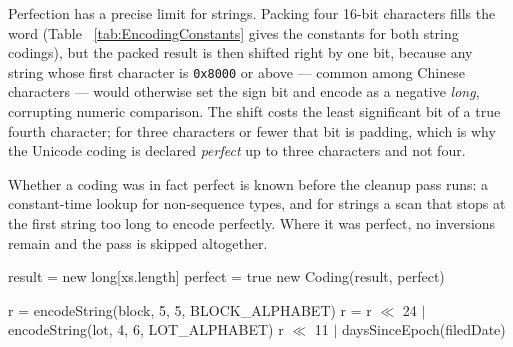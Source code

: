 \documentclass[twoside,leqno,twocolumn]{article}
\begin{document}
Perfection has a precise limit for strings.
Packing four 16-bit characters fills the word (Table ~\ref{tab:EncodingConstants} gives the constants for
both string codings), but the packed result is then shifted right by one bit, because any string whose
first character is \texttt{0x8000} or above --- common among Chinese characters --- would otherwise set the
sign bit and encode as a negative \textit{long}, corrupting numeric comparison.
The shift costs the least significant bit of a true fourth character; for three characters or fewer that
bit is padding, which is why the Unicode coding is declared \textit{perfect} up to three characters and
not four.

Whether a coding was in fact perfect is known before the cleanup pass runs: a constant-time lookup for
non-sequence types, and for strings a scan that stops at the first string too long to encode perfectly.
Where it was perfect, no inversions remain and the pass is skipped altogether.


\begin{algorithm2e}
 result = new long[xs.length]\;
 perfect = true\;
 \Return new Coding(result, perfect)\;
 \caption{huskyEncode. Perfection depends on the data, not only on the coder, so it is settled as the
   codes are computed. \textit{perfectFor} tests one element in constant time: a length comparison for
   a string, the coder's own constant where perfection is data-independent.}
 \label{alg:huskyencode}
\end{algorithm2e}


\begin{algorithm2e}
 r = encodeString(block, 5, 5, BLOCK\_ALPHABET)\;
 r = r $\ll$ 24 $|$ encodeString(lot, 4, 6, LOT\_ALPHABET)\;
 \Return r $\ll$ 11 $|$ daysSinceEpoch(filedDate)\;
 \BlankLine
 \caption{A composite husky coder: \textit{PermitCoder}. \textit{encodeString} packs \textit{width}
   symbols of \textit{bits} each, right-padding with zero.}
 \label{alg:permitcoder}
\end{algorithm2e}
\end{document}
